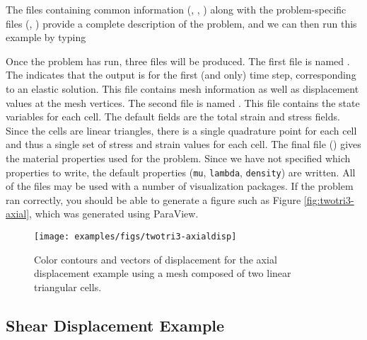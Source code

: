 The files containing common information (,
, ) along with
the problem-specific files (,
) provide a complete description of the
problem, and we can then run this example by typing
Once the problem has run, three files will be produced. The first
file is named . The 
indicates that the output is for the first (and only) time step, corresponding
to an elastic solution. This file contains mesh information as well
as displacement values at the mesh vertices. The second file is named
. This file contains the
state variables for each cell. The default fields are the total strain
and stress fields. Since the cells are linear triangles, there is
a single quadrature point for each cell and thus a single set of stress
and strain values for each cell. The final file ()
gives the material properties used for the problem. Since we have
not specified which properties to write, the default properties (\texttt{mu},
\texttt{lambda}, \texttt{density}) are written. All of the 
files may be used with a number of visualization packages. If the
problem ran correctly, you should be able to generate a figure such
as Figure \vref{fig:twotri3-axial}, which was generated using ParaView.

\begin{figure}
  \texttt{[image: examples/figs/twotri3-axialdisp]}
  \caption{Color contours and vectors of displacement for the axial
    displacement example using a mesh composed of two linear triangular
    cells.}
  \label{fig:twotri3-axial}
\end{figure}


\subsection{Shear Displacement Example}

